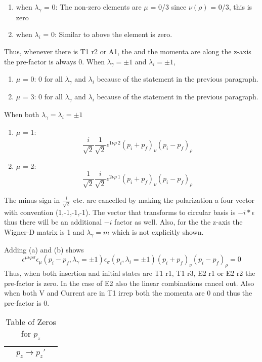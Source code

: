 \documentclass[10pt]{article}
\begin{document}
\begin{enumerate}
\begin{enumerate}
\item when $\lambda_\gamma$ = 0: The non-zero elements are $\mu$ = 0/3 since $\nu(\rho)$ = 0/3, this is zero
\item when $\lambda_i$ = 0:  Similar to above the element is zero.
\end{enumerate}
\par Thus, whenever there is T1 r2 or A1, the and the momenta are along the z-axis the pre-factor is always 0. When $\lambda_\gamma = \pm 1$ and $\lambda_i = \pm 1$,
\begin{enumerate}
\item $\mu$ = 0:  0 for all $\lambda_\gamma$ and $\lambda_i$ because of the statement in the previous paragraph.
\item $\mu$ = 3:  0 for all $\lambda_\gamma$ and $\lambda_i$ because of the statement in the previous paragraph.
\end{enumerate}
When both $\lambda_\gamma = \lambda_i = \pm 1$
\begin{enumerate}
\item $\mu$ = 1:  $$\frac{i}{\sqrt{2}} \frac{1}{\sqrt{2}} \epsilon^{1\nu\rho\ 2} (p_i + p_f)_{\nu}(p_i - p_f)_{\rho}$$
\item $\mu$ = 2:  $$\frac{1}{\sqrt{2}} \frac{i}{\sqrt{2}}\epsilon^{2\nu\rho\ 1} (p_i + p_f)_{\nu}(p_i - p_f)_{\rho} $$
\end{enumerate}
The minus sign in $\frac{i}{\sqrt{2}} $ etc. are cancelled by making the polarization a four vector with convention (1,-1,-1,-1). The vector that transforms to circular basis is $-i*\epsilon$ thus there will be an additional $-i$ factor as well. Also, for the the z-axis the Wigner-D matrix is 1 and $\lambda_{\gamma} = m$ which is not explicitly shown. \par
Adding (a) and (b) shows
$$\epsilon^{\mu\nu\rho\sigma}\epsilon_{\mu}(p_i - p_f, \lambda_{\gamma} = \pm 1)\epsilon_{\sigma}(p_i, \lambda_i = \pm 1)(p_i + p_f)_{\nu}(p_i - p_f)_{\rho} = 0$$
Thus, when both insertion and initial states are T1 r1, T1 r3, E2 r1 or E2 r2 the pre-factor is zero. In the case of E2 also the linear combinations cancel out. Also when both V and Current are in T1 irrep both the momenta are 0 and thus the pre-factor is 0. \par


\begin{table}[!htbp]
\caption {Table of Zeros for $p_z$}
\begin{minipage}{0.33\textwidth}
\raggedright
\begin{tabular}{cc c}
 &$p_z \rightarrow p_z' $&\\ \hline
 

\end{tabular}
\end{minipage}
\end{table}
\end{enumerate}
\end{document}
